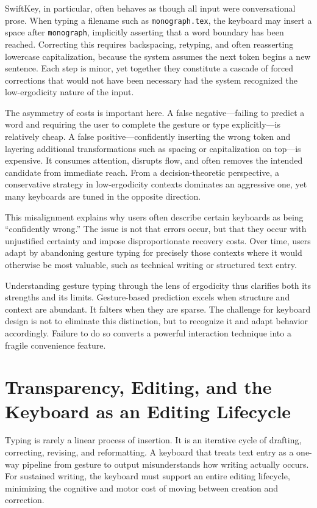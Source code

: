 \documentclass[11pt]{article}
\begin{document}
SwiftKey, in particular, often behaves as though all input were conversational prose. When typing a filename such as \texttt{monograph.tex}, the keyboard may insert a space after \texttt{monograph}, implicitly asserting that a word boundary has been reached. Correcting this requires backspacing, retyping, and often reasserting lowercase capitalization, because the system assumes the next token begins a new sentence. Each step is minor, yet together they constitute a cascade of forced corrections that would not have been necessary had the system recognized the low-ergodicity nature of the input.

The asymmetry of costs is important here. A false negative—failing to predict a word and requiring the user to complete the gesture or type explicitly—is relatively cheap. A false positive—confidently inserting the wrong token and layering additional transformations such as spacing or capitalization on top—is expensive. It consumes attention, disrupts flow, and often removes the intended candidate from immediate reach. From a decision-theoretic perspective, a conservative strategy in low-ergodicity contexts dominates an aggressive one, yet many keyboards are tuned in the opposite direction.

This misalignment explains why users often describe certain keyboards as being ``confidently wrong.'' The issue is not that errors occur, but that they occur with unjustified certainty and impose disproportionate recovery costs. Over time, users adapt by abandoning gesture typing for precisely those contexts where it would otherwise be most valuable, such as technical writing or structured text entry.

Understanding gesture typing through the lens of ergodicity thus clarifies both its strengths and its limits. Gesture-based prediction excels when structure and context are abundant. It falters when they are sparse. The challenge for keyboard design is not to eliminate this distinction, but to recognize it and adapt behavior accordingly. Failure to do so converts a powerful interaction technique into a fragile convenience feature.

\section{Transparency, Editing, and the Keyboard as an Editing Lifecycle}

Typing is rarely a linear process of insertion. It is an iterative cycle of drafting, correcting, revising, and reformatting. A keyboard that treats text entry as a one-way pipeline from gesture to output misunderstands how writing actually occurs. For sustained writing, the keyboard must support an entire editing lifecycle, minimizing the cognitive and motor cost of moving between creation and correction.
\end{document}
